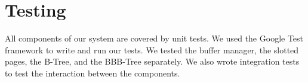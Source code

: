 \section{Testing}
All components of our system are covered by unit tests.
We used the Google Test framework to write and run our tests.
We tested the buffer manager, the slotted pages, the B-Tree, and the BBB-Tree separately.
We also wrote integration tests to test the interaction between the components.













